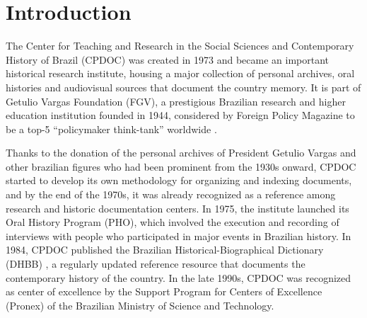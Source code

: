 \section{Introduction}\label{sec:intro}

%

The Center for Teaching and Research in the Social Sciences and
Contemporary History of Brazil (CPDOC) was created in 1973 and became
an important historical research institute, housing a major collection
of personal archives, oral histories and audiovisual sources that
document the country memory. It is part of Getulio Vargas Foundation
(FGV), a prestigious Brazilian research and higher education
institution founded in 1944, considered by Foreign Policy Magazine to
be a top-5 ``policymaker think-tank'' worldwide \cite{think-tank}.

Thanks to the donation of the personal archives of President Getulio
Vargas and other brazilian figures who had been prominent from the
1930s onward, CPDOC started to develop its own methodology for
organizing and indexing documents, and by the end of the 1970s, it was
already recognized as a reference among research and historic
documentation centers. In 1975, the institute launched its Oral
History Program (PHO), which involved the execution and recording of
interviews with people who participated in major events in Brazilian
history. In 1984, CPDOC published the Brazilian
Historical-Biographical Dictionary (DHBB) \cite{dhbb}, a regularly
updated reference resource that documents the contemporary history of
the country. In the late 1990s, CPDOC was recognized as center of
excellence by the Support Program for Centers of Excellence (Pronex)
of the Brazilian Ministry of Science and Technology.

